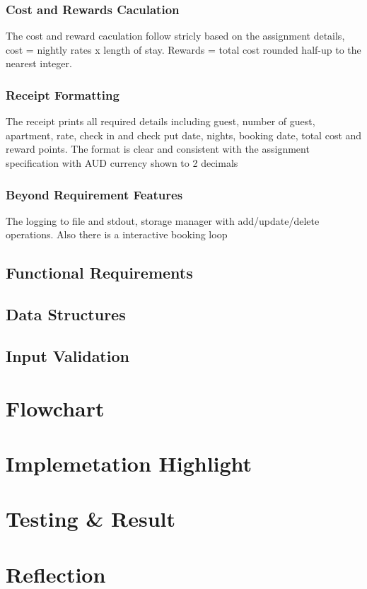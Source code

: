 \documentclass[conference]{IEEEtran}
\begin{document}
\subsubsection{Cost and Rewards Caculation}
The cost and reward caculation follow stricly based on the assignment details, cost = nightly rates x length of stay. Rewards = total cost rounded half-up to the nearest integer.
\subsubsection{Receipt Formatting}
The receipt prints all required details including guest, number of guest, apartment, rate, check in and check put date, nights, booking date, total cost and reward points. The format is clear and consistent with the assignment specification with AUD currency shown to 2 decimals
\subsubsection{Beyond Requirement Features}
The logging to file and stdout, storage manager with add/update/delete operations. Also there is a interactive booking loop 
\subsection{Functional Requirements}

\subsection{Data Structures}

\subsection{Input Validation}

\section{Flowchart}

\section{Implemetation Highlight}

\section{Testing \& Result}

\section{Reflection}
\end{document}
